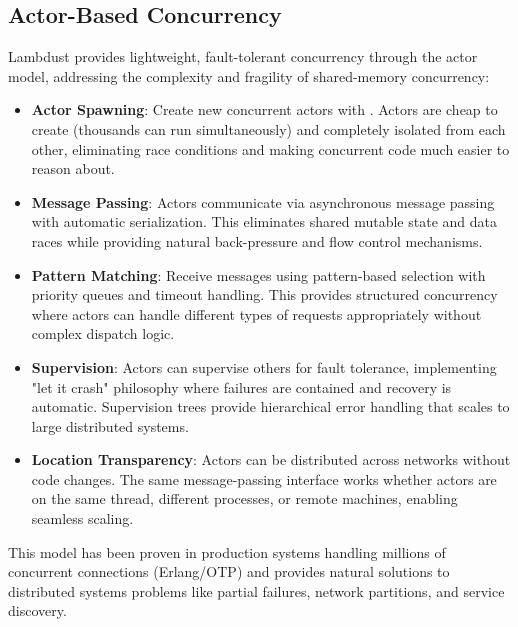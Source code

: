 \subsection{Actor-Based Concurrency}
\label{subsec:concurrency}

Lambdust provides lightweight, fault-tolerant concurrency through the actor model, addressing the complexity and fragility of shared-memory concurrency:

\begin{itemize}
\item \textbf{Actor Spawning}: Create new concurrent actors with . Actors are cheap to create (thousands can run simultaneously) and completely isolated from each other, eliminating race conditions and making concurrent code much easier to reason about.

\item \textbf{Message Passing}: Actors communicate via asynchronous message passing with automatic serialization. This eliminates shared mutable state and data races while providing natural back-pressure and flow control mechanisms.

\item \textbf{Pattern Matching}: Receive messages using pattern-based selection with priority queues and timeout handling. This provides structured concurrency where actors can handle different types of requests appropriately without complex dispatch logic.

\item \textbf{Supervision}: Actors can supervise others for fault tolerance, implementing "let it crash" philosophy where failures are contained and recovery is automatic. Supervision trees provide hierarchical error handling that scales to large distributed systems.

\item \textbf{Location Transparency}: Actors can be distributed across networks without code changes. The same message-passing interface works whether actors are on the same thread, different processes, or remote machines, enabling seamless scaling.
\end{itemize}

This model has been proven in production systems handling millions of concurrent connections (Erlang/OTP) and provides natural solutions to distributed systems problems like partial failures, network partitions, and service discovery.

